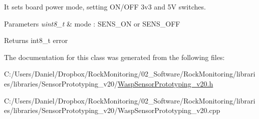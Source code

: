 It sets board power mode, setting O\+N/\+O\+FF 3v3 and 5V switches. 


\begin{DoxyParams}{Parameters}
{\em uint8\+\_\+t} & mode \+: S\+E\+N\+S\+\_\+\+ON or S\+E\+N\+S\+\_\+\+O\+FF \\
\hline
\end{DoxyParams}
\begin{DoxyReturn}{Returns}
int8\+\_\+t error 
\end{DoxyReturn}


The documentation for this class was generated from the following files\+:\begin{DoxyCompactItemize}
\item 
C\+:/\+Users/\+Daniel/\+Dropbox/\+Rock\+Monitoring/02\+\_\+\+Software/\+Rock\+Monitoring/libraries/libraries/\+Sensor\+Prototyping\+\_\+v20/\hyperlink{_wasp_sensor_prototyping__v20_8h}{Wasp\+Sensor\+Prototyping\+\_\+v20.\+h}\item 
C\+:/\+Users/\+Daniel/\+Dropbox/\+Rock\+Monitoring/02\+\_\+\+Software/\+Rock\+Monitoring/libraries/libraries/\+Sensor\+Prototyping\+\_\+v20/Wasp\+Sensor\+Prototyping\+\_\+v20.\+cpp\end{DoxyCompactItemize}
